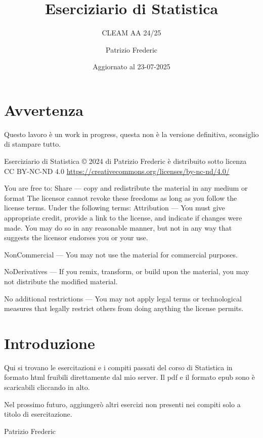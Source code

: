 \documentclass[
  11pt,
]{book}
\title{Eserciziario di Statistica}
\subtitle{CLEAM AA 24/25}
\author{Patrizio Frederic}
\date{Aggiornato al 23-07-2025}
\theoremstyle{mytheoremstyle}
\theoremstyle{mydefstyle}
\begin{document}
\maketitle

{
\setcounter{tocdepth}{1}
\tableofcontents
}
\chapter*{Avvertenza}\label{avvertenza}

\large

Questo lavoro è un work in progress, questa non è la versione definitiva, sconsiglio di stampare tutto.

\normalsize

Eserciziario di Statistica © 2024 di Patrizio Frederic è distribuito
sotto licenza CC BY-NC-ND 4.0
\url{https://creativecommons.org/licenses/by-nc-nd/4.0/}

You are free to:
Share --- copy and redistribute the material in any medium or format
The licensor cannot revoke these freedoms as long as you follow the license terms.
Under the following terms:
Attribution --- You must give appropriate credit, provide a link to the license, and indicate if changes were made. You may do so in any reasonable manner, but not in any way that suggests the licensor endorses you or your use.

NonCommercial --- You may not use the material for commercial purposes.

NoDerivatives --- If you remix, transform, or build upon the material, you may not distribute the modified material.

No additional restrictions --- You may not apply legal terms or technological measures that legally restrict others from doing anything the license permits.

\chapter*{Introduzione}\label{introduzione}

Qui si trovano le esercitazioni e i compiti passati del corso di Statistica
in formato html fruibili direttamente dal mio server.
Il pdf e il formato epub sono è scaricabili cliccando in alto.

Nel prossimo futuro, aggiungerò altri esercizi non presenti nei compiti solo a titolo
di esercitazione.

Patrizio Frederic
\end{document}
